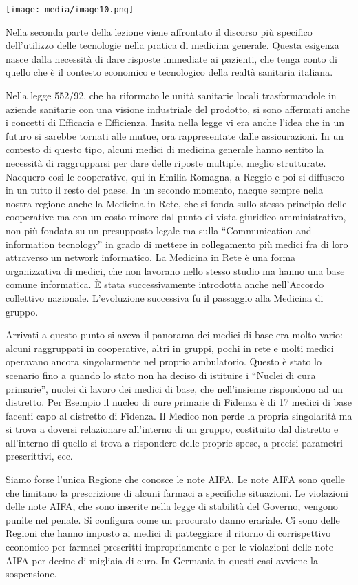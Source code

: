 \documentclass[]{article}
\begin{document}
\texttt{[image: media/image10.png]}

Nella seconda parte della lezione viene affrontato il discorso più
specifico dell'utilizzo delle tecnologie nella pratica di medicina
generale. Questa esigenza nasce dalla necessità di dare risposte
immediate ai pazienti, che tenga conto di quello che è il contesto
economico e tecnologico della realtà sanitaria italiana.

Nella legge 552/92, che ha riformato le unità sanitarie locali
trasformandole in aziende sanitarie con una visione industriale del
prodotto, si sono affermati anche i concetti di Efficacia e Efficienza.
Insita nella legge vi era anche l'idea che in un futuro si sarebbe
tornati alle mutue, ora rappresentate dalle assicurazioni. In un
contesto di questo tipo, alcuni medici di medicina generale hanno
sentito la necessità di raggrupparsi per dare delle riposte multiple,
meglio strutturate. Nacquero così le cooperative, qui in Emilia Romagna,
a Reggio e poi si diffusero in un tutto il resto del paese. In un
secondo momento, nacque sempre nella nostra regione anche la Medicina in
Rete, che si fonda sullo stesso principio delle cooperative ma con un
costo minore dal punto di vista giuridico-amministrativo, non più
fondata su un presupposto legale ma sulla ``Communication and
information tecnology'' in grado di mettere in collegamento più medici
fra di loro attraverso un network informatico. La Medicina in Rete è una
forma organizzativa di medici, che non lavorano nello stesso studio ma
hanno una base comune informatica. È stata successivamente introdotta
anche nell'Accordo collettivo nazionale. L'evoluzione successiva fu il
passaggio alla Medicina di gruppo.

Arrivati a questo punto si aveva il panorama dei medici di base era
molto vario: alcuni raggruppati in cooperative, altri in gruppi, pochi
in rete e molti medici operavano ancora singolarmente nel proprio
ambulatorio. Questo è stato lo scenario fino a quando lo stato non ha
deciso di istituire i ``Nuclei di cura primarie'', nuclei di lavoro dei
medici di base, che nell'insieme rispondono ad un distretto. Per Esempio
il nucleo di cure primarie di Fidenza è di 17 medici di base facenti
capo al distretto di Fidenza. Il Medico non perde la propria singolarità
ma si trova a doversi relazionare all'interno di un gruppo, costituito
dal distretto e all'interno di quello si trova a rispondere delle
proprie spese, a precisi parametri prescrittivi, ecc.

Siamo forse l'unica Regione che conosce le note AIFA. Le note AIFA sono
quelle che limitano la prescrizione di alcuni farmaci a specifiche
situazioni. Le violazioni delle note AIFA, che sono inserite nella legge
di stabilità del Governo, vengono punite nel penale. Si configura come
un procurato danno erariale. Ci sono delle Regioni che hanno imposto ai
medici di patteggiare il ritorno di corrispettivo economico per farmaci
prescritti impropriamente e per le violazioni delle note AIFA per decine
di migliaia di euro. In Germania in questi casi avviene la sospensione.
\end{document}
